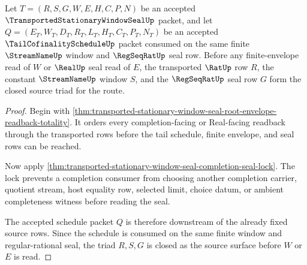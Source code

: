 \begin{theorem}
\label{thm:transported-stationary-window-seal-completion-source-triad-closure}
Let $T=(R,S,G,W,E,H,C,P,N)$ be an accepted $\TransportedStationaryWindowSealUp$ packet, and let $Q=(E_T,W_T,D_T,R_T,L_T,H_T,C_T,P_T,N_T)$ be an accepted $\TailCofinalityScheduleUp$ packet consumed on the same finite $\StreamNameUp$ window and $\RegSeqRatUp$ seal row. Before any finite-envelope read of $W$ or $\RealUp$ seal read of $E$, the transported $\RatUp$ row $R$, the constant $\StreamNameUp$ window $S$, and the $\RegSeqRatUp$ seal row $G$ form the closed source triad for the route.
\end{theorem}
\begin{proof}
Begin with \autoref{thm:transported-stationary-window-seal-root-envelope-readback-totality}. It orders every completion-facing or Real-facing readback through the transported rows before the tail schedule, finite envelope, and seal rows can be reached.

Now apply \autoref{thm:transported-stationary-window-seal-completion-seal-lock}. The lock prevents a completion consumer from choosing another completion carrier, quotient stream, host equality row, selected limit, choice datum, or ambient completeness witness before reading the seal.

The accepted schedule packet $Q$ is therefore downstream of the already fixed source rows. Since the schedule is consumed on the same finite window and regular-rational seal, the triad $R,S,G$ is closed as the source surface before $W$ or $E$ is read.
\end{proof}


